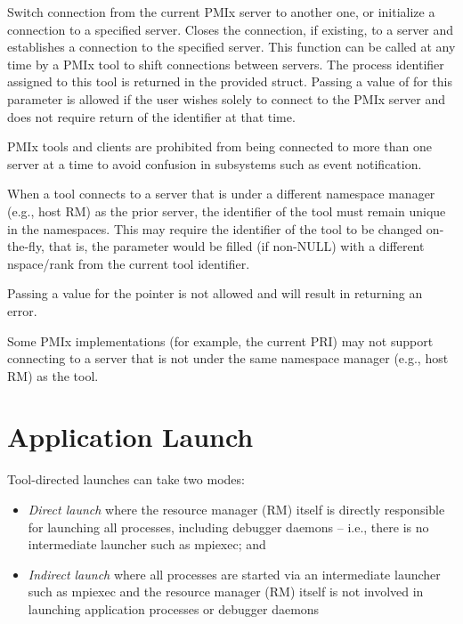 
\reqattrend

\descr

Switch connection from the current \ac{PMIx} server to another one, or initialize a connection to a specified server. Closes the connection, if existing, to a server and establishes a connection to the specified server. This function can be called at any time by a \ac{PMIx} tool to shift connections between servers.
The process identifier assigned to this tool is returned in the provided  struct. Passing a value of  for this parameter is allowed if the user wishes solely to connect to the \ac{PMIx} server and does not require return of the identifier at that time.

\adviceimplstart
\ac{PMIx} tools and clients are prohibited from being connected to more than one server at a time to avoid confusion in subsystems such as event notification.

When a tool connects to a server that is under a different namespace manager (e.g., host \ac{RM}) as the prior server, the identifier of the tool must remain unique in the namespaces. This may require the identifier of the tool to be changed on-the-fly, that is, the  parameter would be filled (if non-NULL) with a different nspace/rank from the current tool identifier.
\adviceimplend

\adviceuserstart
Passing a  value for the  pointer is not allowed and will result in returning an error.

Some \ac{PMIx} implementations (for example, the current \ac{PRI}) may not support connecting to a server that is not under the same namespace manager (e.g., host \ac{RM}) as the tool.
\adviceuserend


\section{Application Launch}
\label{chap:api_tools:launch}

Tool-directed launches can take two modes:

\begin{itemize}
    \item \emph{Direct launch} where the resource manager (RM) itself is directly responsible for launching all processes, including debugger daemons – i.e., there is no intermediate launcher such as mpiexec; and
    \item \emph{Indirect launch} where all processes are started via an intermediate launcher such as mpiexec and the resource manager (RM) itself is not involved in launching application processes or debugger daemons
\end{itemize}


